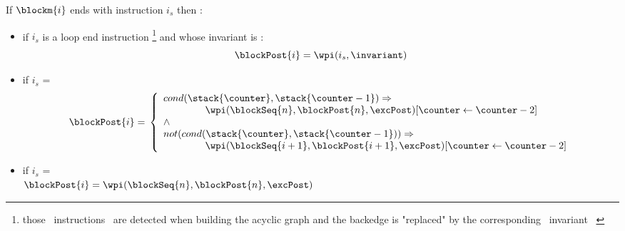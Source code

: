  \begin{defn}\label{post}
 If $\blockm{i}$ ends with instruction $i_s$ then :
 \begin{itemize} 
 \item  if  $i_s$ is a loop end instruction \wpi \footnote{those \ instructions \ are detected when building the acyclic  graph and the 
 backedge is "replaced"  by the corresponding \ invariant \ \invariant  } and whose invariant is \invariant: 
 $$ \blockPost{i} =  \wpi(  i_s, \invariant)  $$ 
 \item if  $i_s$ =   \\
$$
\blockPost{i} =  \\
\left\{
\begin{array}{l}
cond( \stack{\counter}, \stack{\counter - 1} )   \Rightarrow \\
\phantom{ \counter }   \wpi(\blockSeq{n}, \blockPost{n} ,\excPost )[ \counter \leftarrow \counter -2 ]  \\
\wedge \\
 not ( cond( \stack{\counter}, \stack{\counter - 1} )  )   \Rightarrow \\
\phantom{ \counter}    \wpi(\blockSeq{i+1}, \blockPost{i+1},\excPost ) [ \counter \leftarrow \counter -2 ]      \\                             
\end{array}
\right.
$$
\item if  $i_s$ =   \\ 
$\blockPost{i} =  \wpi(\blockSeq{n}, \blockPost{n} , \excPost )$ \\


\end{itemize}
\end{defn}
